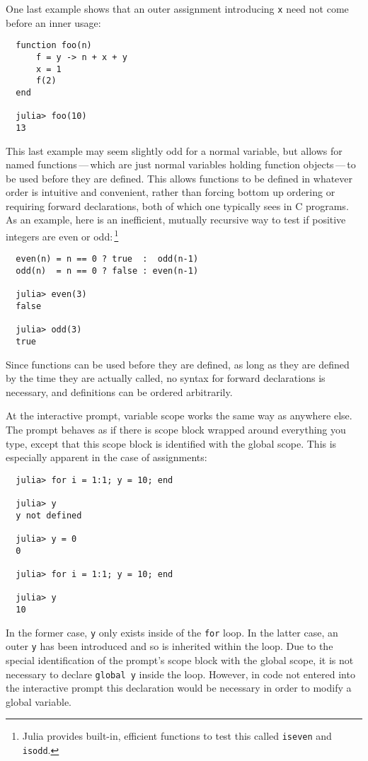 \documentclass{article}
\begin{document}
One last example shows that an outer assignment introducing \verb|x| need not come before an inner usage:
\begin{verbatim}
  function foo(n)
      f = y -> n + x + y
      x = 1
      f(2)
  end

  julia> foo(10)
  13
\end{verbatim}
This last example may seem slightly odd for a normal variable, but allows for named functions\,---\,which are just normal variables holding function objects\,---\,to be used before they are defined.
This allows functions to be defined in whatever order is intuitive and convenient, rather than forcing bottom up ordering or requiring forward declarations, both of which one typically sees in C programs.
As an example, here is an inefficient, mutually recursive way to test if positive integers are even or odd:\,\footnote{Julia provides built-in, efficient functions to test this called \texttt{iseven} and \texttt{isodd}.}
\begin{verbatim}
  even(n) = n == 0 ? true  :  odd(n-1)
  odd(n)  = n == 0 ? false : even(n-1)

  julia> even(3)
  false

  julia> odd(3)
  true
\end{verbatim}
Since functions can be used before they are defined, as long as they are defined by the time they are actually called, no syntax for forward declarations is necessary, and definitions can be ordered arbitrarily.

At the interactive prompt, variable scope works the same way as anywhere
else. The prompt behaves as if there is scope block wrapped around everything
you type, except that this scope block is identified with the global scope.
This is especially apparent in the case of assignments:
\begin{verbatim}
  julia> for i = 1:1; y = 10; end
  
  julia> y
  y not defined
  
  julia> y = 0
  0
  
  julia> for i = 1:1; y = 10; end
  
  julia> y
  10
\end{verbatim}
In the former case, \verb|y| only exists inside of the \verb|for| loop.
In the latter case, an outer \verb|y| has been introduced and so is inherited
within the loop. Due to the special identification of the prompt's scope
block with the global scope, it is not necessary to declare
\verb|global y| inside the loop. However, in code not entered into the interactive prompt
this declaration would be necessary in order to modify a global variable.
\end{document}
